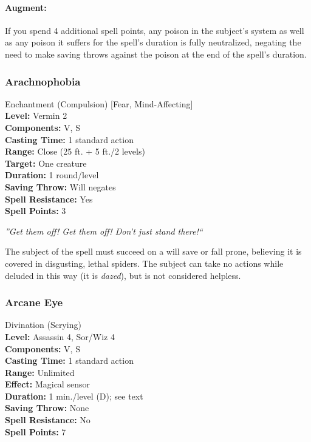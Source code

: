 \paragraph{Augment:} If you spend 4 additional spell points, any poison in the subject's system as well as any poison it suffers for the spell's duration is fully neutralized, negating the need to make saving throws against the poison at the end of the spell's duration.
\subsubsection{Arachnophobia}
\label{Spell:Arachnophobia}
Enchantment (Compulsion) [Fear, Mind-Affecting]
\\ \textbf{Level:} Vermin 2
\\ \textbf{Components:} V, S
\\ \textbf{Casting Time:} 1 standard action
\\ \textbf{Range:} Close (25 ft. + 5 ft./2 levels)
\\ \textbf{Target:} One creature
\\ \textbf{Duration:} 1 round/level
\\ \textbf{Saving Throw:} Will negates
\\ \textbf{Spell Resistance:} Yes
\\ \textbf{Spell Points:} 3

\emph{''Get them off! Get them off! Don't just stand there!``} 

The subject of the spell must succeed on a will save or fall prone, believing it is covered in disgusting, lethal spiders. 
The subject can take no actions while deluded in this way (it is \emph{dazed}), but is not considered helpless.

\subsubsection{Arcane Eye}
\label{Spell:ArcaneEye}
Divination (Scrying)
\\ \textbf{Level:} Assassin 4, Sor/Wiz 4
\\ \textbf{Components:} V, S
\\ \textbf{Casting Time:} 1 standard action
\\ \textbf{Range:} Unlimited
\\ \textbf{Effect:} Magical sensor
\\ \textbf{Duration:} 1 min./level (D); see text
\\ \textbf{Saving Throw:} None
\\ \textbf{Spell Resistance:} No
\\ \textbf{Spell Points:} 7


